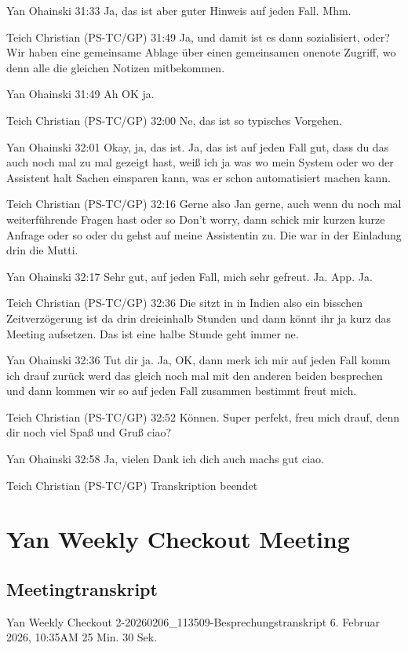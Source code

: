 Yan Ohainski   31:33
Ja, das ist aber guter Hinweis auf jeden Fall.
Mhm.

Teich Christian (PS-TC/GP)   31:49
Ja, und damit ist es dann sozialisiert, oder? Wir haben eine gemeinsame Ablage über einen gemeinsamen onenote Zugriff, wo denn alle die gleichen Notizen mitbekommen.

Yan Ohainski   31:49
Ah OK ja.

Teich Christian (PS-TC/GP)   32:00
Ne, das ist so typisches Vorgehen.

Yan Ohainski   32:01
Okay, ja, das ist.
Ja, das ist auf jeden Fall gut, dass du das auch noch mal zu mal gezeigt hast, weiß ich ja was wo mein System oder wo der Assistent halt Sachen einsparen kann, was er schon automatisiert machen kann.

Teich Christian (PS-TC/GP)   32:16
Gerne also Jan gerne, auch wenn du noch mal weiterführende Fragen hast oder so Don't worry, dann schick mir kurzen kurze Anfrage oder so oder du gehst auf meine Assistentin zu. Die war in der Einladung drin die Mutti.

Yan Ohainski   32:17
Sehr gut, auf jeden Fall, mich sehr gefreut.
Ja.
App.
Ja.

Teich Christian (PS-TC/GP)   32:36
Die sitzt in in Indien also ein bisschen Zeitverzögerung ist da drin dreieinhalb Stunden und dann könnt ihr ja kurz das Meeting aufsetzen. Das ist eine halbe Stunde geht immer ne.

Yan Ohainski   32:36
Tut dir ja.
Ja, OK, dann merk ich mir auf jeden Fall komm ich drauf zurück werd das gleich noch mal mit den anderen beiden besprechen und dann kommen wir so auf jeden Fall zusammen bestimmt freut mich.

Teich Christian (PS-TC/GP)   32:52
Können.
Super perfekt, freu mich drauf, denn dir noch viel Spaß und Gruß ciao?

Yan Ohainski   32:58
Ja, vielen Dank ich dich auch machs gut ciao.

Teich Christian (PS-TC/GP) Transkription beendet

\section{Yan Weekly Checkout Meeting}
\subsection{Meetingtranskript}
\label{app:Weekly_transkript}
Yan Weekly Checkout 2-20260206\_113509-Besprechungstranskript
6. Februar 2026, 10:35AM
25 Min. 30 Sek.

